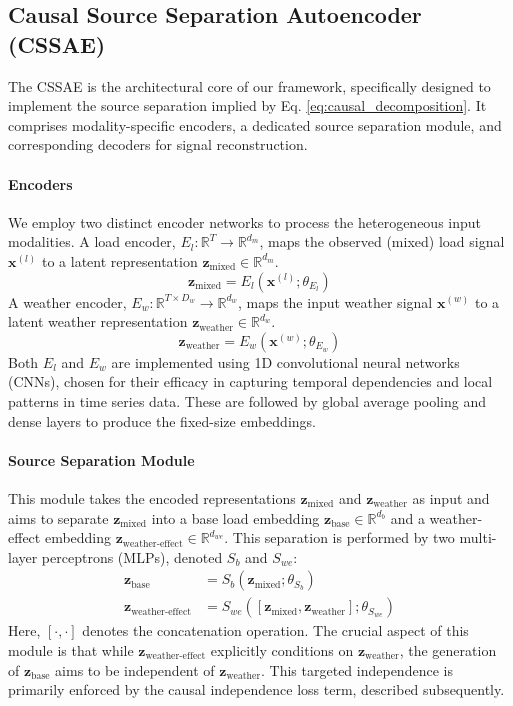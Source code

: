 \documentclass[journal]{IEEEtran}
\begin{document}
\subsection{Causal Source Separation Autoencoder (CSSAE)}
The CSSAE is the architectural core of our framework, specifically designed to implement the source separation implied by Eq. \ref{eq:causal_decomposition}. It comprises modality-specific encoders, a dedicated source separation module, and corresponding decoders for signal reconstruction.

\paragraph{Encoders}
We employ two distinct encoder networks to process the heterogeneous input modalities.
A load encoder, $E_l: \mathbb{R}^T \to \mathbb{R}^{d_m}$, maps the observed (mixed) load signal $\mathbf{x}^{(l)}$ to a latent representation $\mathbf{z}_{\text{mixed}} \in \mathbb{R}^{d_m}$.
\begin{equation}
\mathbf{z}_{\text{mixed}} = E_l(\mathbf{x}^{(l)}; \theta_{E_l})
\end{equation}
A weather encoder, $E_w: \mathbb{R}^{T \times D_w} \to \mathbb{R}^{d_w}$, maps the input weather signal $\mathbf{x}^{(w)}$ to a latent weather representation $\mathbf{z}_{\text{weather}} \in \mathbb{R}^{d_w}$.
\begin{equation}
\mathbf{z}_{\text{weather}} = E_w(\mathbf{x}^{(w)}; \theta_{E_w})
\end{equation}
Both $E_l$ and $E_w$ are implemented using 1D convolutional neural networks (CNNs), chosen for their efficacy in capturing temporal dependencies and local patterns in time series data. These are followed by global average pooling and dense layers to produce the fixed-size embeddings.

\paragraph{Source Separation Module}
This module takes the encoded representations $\mathbf{z}_{\text{mixed}}$ and $\mathbf{z}_{\text{weather}}$ as input and aims to separate $\mathbf{z}_{\text{mixed}}$ into a base load embedding $\mathbf{z}_{\text{base}} \in \mathbb{R}^{d_b}$ and a weather-effect embedding $\mathbf{z}_{\text{weather-effect}} \in \mathbb{R}^{d_{we}}$. This separation is performed by two multi-layer perceptrons (MLPs), denoted $S_b$ and $S_{we}$:
\begin{align}
\mathbf{z}_{\text{base}} &= S_b(\mathbf{z}_{\text{mixed}}; \theta_{S_b}) \\
\mathbf{z}_{\text{weather-effect}} &= S_{we}([\mathbf{z}_{\text{mixed}}, \mathbf{z}_{\text{weather}}]; \theta_{S_{we}})
\end{align}
Here, $[\cdot, \cdot]$ denotes the concatenation operation. The crucial aspect of this module is that while $\mathbf{z}_{\text{weather-effect}}$ explicitly conditions on $\mathbf{z}_{\text{weather}}$, the generation of $\mathbf{z}_{\text{base}}$ aims to be independent of $\mathbf{z}_{\text{weather}}$. This targeted independence is primarily enforced by the causal independence loss term, described subsequently.
\end{document}
